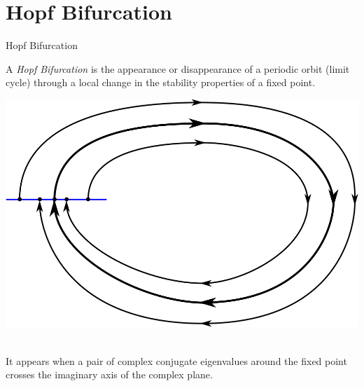 \documentclass{beamer}
\begin{document}
\section{Hopf Bifurcation}
\begin{frame}{Hopf Bifurcation}
    \begin{definition}
        A \emph{Hopf Bifurcation} is the appearance or disappearance of a periodic orbit (limit cycle) 
        through a local change in the stability properties of a fixed point.
    \end{definition}
    \includegraphics[width=.4\textwidth]{grafik/limitcycle}
    
    ~\\
    
    It appears when a pair of complex conjugate eigenvalues around the fixed point 
    crosses the imaginary axis of the complex plane.

\end{frame} 
\end{document}
